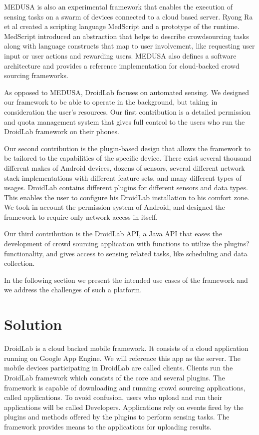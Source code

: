 \documentclass[conference,letterpaper]{IEEEtran}
\begin{document}
MEDUSA is also an experimental framework that enables the execution of sensing tasks on a swarm of devices connected to a cloud based server. Ryong Ra et al created a scripting language MedScript and a prototype of the runtime. MedScript introduced an abstraction that helps to describe crowdsourcing tasks along with language constructs that map to user involvement, like requesting user input or user actions and rewarding users. MEDUSA also defines a software architecture and provides a reference implementation for cloud-backed crowd sourcing frameworks.

As opposed to MEDUSA, DroidLab focuses on automated sensing. We designed our framework to be able to operate in the background, but taking in consideration the user's resources. Our first contribution is a detailed permission and quota management system that gives full control to the users who run the DroidLab framework on their phones.

Our second contribution is the plugin-based design that allows the framework to be tailored to the capabilities of the specific device. There exist several thousand different makes of Android devices, dozens of sensors, several different network stack implementations with different feature sets, and many different types of usages. DroidLab contains different plugins for different sensors and data types. This enables the user to configure his DroidLab installation to his comfort zone. We took in account the permission system of Android, and designed the framework to require only network access in itself.

Our third contribution is the DroidLab API, a Java API that eases the development of crowd sourcing application with functions to utilize the plugins? functionality, and gives access to sensing related tasks, like scheduling and data collection.

In the following section we present the intended use cases of the framework and we address the challenges of such a platform.

\section{Solution}
\label{sec:solution}
DroidLab is a cloud backed mobile framework. It consists of a cloud application running on Google App Engine. We will reference this app as the server. The mobile devices participating in DroidLab are called clients. Clients run the DroidLab framework which consists of the core and several plugins. The framework is capable of downloading and running crowd sourcing applications, called applications. To avoid confusion, users who upload and run their applications will be called Developers. Applications rely on events fired by the plugins and methods offered by the plugins to perform sensing tasks. The framework provides means to the applications for uploading results.
\end{document}
